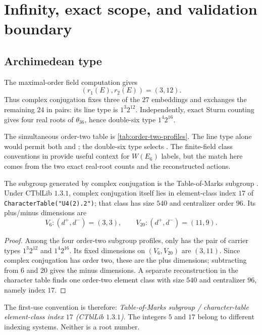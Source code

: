 \section{Infinity, exact scope, and validation boundary}
\label{sec:infinity-scope}

\subsection{Archimedean type}

The maximal-order field computation gives
\begin{equation}
 (r_1(E),r_2(E))=(3,12).
\label{eq:E-signature}
\end{equation}
Thus complex conjugation fixes three of the $27$ embeddings and exchanges
the remaining $24$ in pairs: its line type is $1^3 2^{12}$.
Independently, exact Sturm counting gives four real roots of
$\theta_{36}$, hence double-six type $1^4 2^{16}$.

The simultaneous order-two table is \cref{tab:order-two-profiles}.  The line
type alone would permit both  and ; the double-six type selects
.  The finite-field class conventions in
\citet[Table 7.1]{banwaitfite2019delpezzo} provide useful context for
$W(E_6)$ labels, but the match here comes from the two exact real-root
counts and the reconstructed actions.

\begin{proposition}
\label{prop:infinity}
The subgroup generated by complex conjugation is the Table-of-Marks subgroup
.  Under CTblLib $1.3.1$, complex conjugation itself lies in
element-class index $17$ of \texttt{CharacterTable("U4(2).2")}; that class
has size $540$ and centralizer order $96$.  Its plus/minus dimensions are
\[
 V_6:(d^+,d^-)=(3,3),\qquad
 V_{20}:(d^+,d^-)=(11,9).
\]
\end{proposition}

\begin{proof}
Among the four order-two subgroup profiles, only  has the pair of
carrier types $1^3 2^{12}$ and $1^4 2^{16}$.  Its fixed dimensions on
$(V_6,V_{20})$ are $(3,11)$.  Since complex conjugation has order two, these
are the plus dimensions; subtracting from $6$ and $20$ gives the minus
dimensions.  A separate reconstruction in the character table finds one
order-two element class with size $540$ and centralizer $96$, namely index
$17$.
\end{proof}

The first-use convention is therefore: \emph{Table-of-Marks subgroup
 / character-table element-class index $17$ (CTblLib $1.3.1$)}.  The
integers $5$ and $17$ belong to different indexing systems.  Neither is a
root number.

